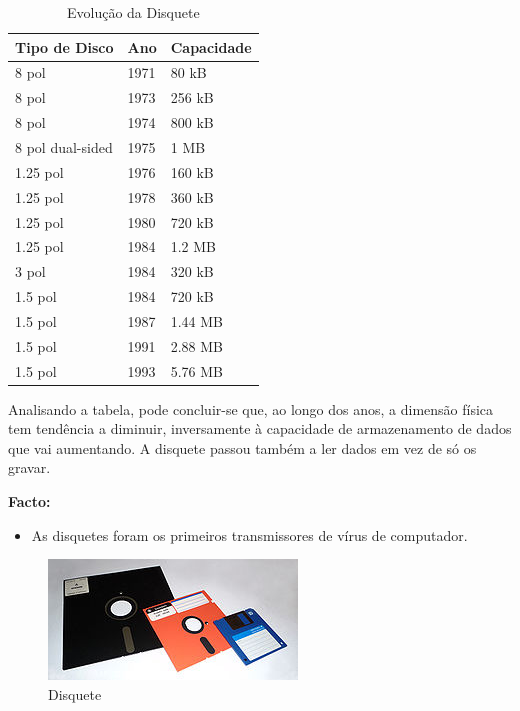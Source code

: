 \documentclass{report}
\begin{document}
	\begin{table}[h]
		\centering
		\caption{Evolução da Disquete}
		\label{my-label}
		\begin{tabular}{|l|l|l|}
		\hline
		\textbf{Tipo de Disco} & \textbf{Ano} & \textbf{Capacidade} \\ \hline
		8 pol            & 1971 & 80 kB   \\ \hline
		8 pol            & 1973 & 256 kB  \\ \hline
		8 pol            & 1974 & 800 kB  \\ \hline
		8 pol dual-sided & 1975 & 1 MB    \\ \hline
		1.25 pol         & 1976 & 160 kB  \\ \hline
		1.25 pol         & 1978 & 360 kB  \\ \hline
		1.25 pol         & 1980 & 720 kB  \\ \hline
		1.25 pol         & 1984 & 1.2 MB  \\ \hline
		3 pol            & 1984 & 320 kB  \\ \hline
		1.5 pol          & 1984 & 720 kB  \\ \hline
		1.5 pol          & 1987 & 1.44 MB \\ \hline
		1.5 pol          & 1991 & 2.88 MB \\ \hline
		1.5 pol          & 1993 & 5.76 MB \\ \hline
		
		\end{tabular}
		\end{table}		
 
	Analisando a tabela, pode concluir-se que, ao longo dos anos, a dimensão física tem tendência a diminuir, inversamente à capacidade de armazenamento de dados que vai aumentando. A disquete passou também a ler dados em vez de só os gravar. 

	\textbf{Facto:}	
		\begin{itemize}
		 	\item As disquetes foram os primeiros transmissores de vírus de computador. 
	 	\end{itemize}
	
	
	\begin{figure} [h]
		\centering
		\includegraphics[scale=1]{disquete.jpg}
		\caption{Disquete}
	\end{figure}
	
\end{document}
